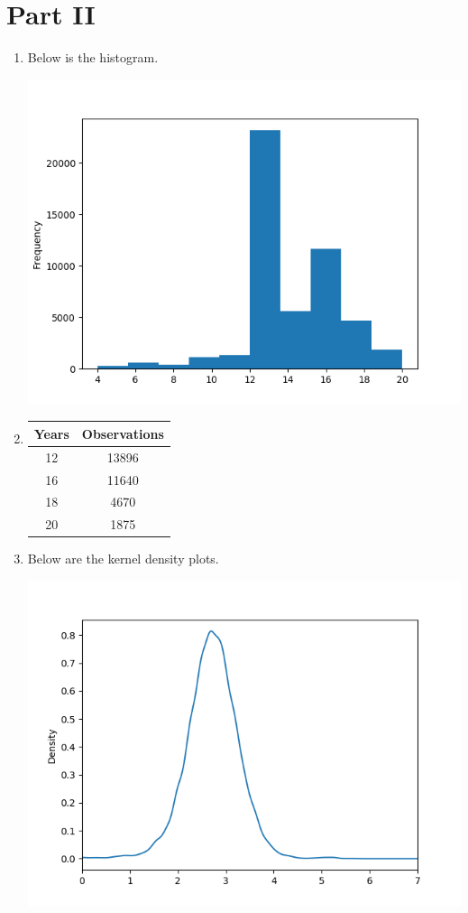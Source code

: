 \documentclass{article}
\begin{document}
\section{Part II}
\begin{enumerate}[label=\alph*)]
\item

Below is the histogram.

\includegraphics[scale=.8]{part_a}

\item

\begin{tabular}{ c c }
 Years & Observations \\
 \hline
 12 & 13896 \\ 
 16 & 11640 \\ 
 18 & 4670  \\ 
 20 & 1875 
\end{tabular}


\item

Below are the kernel density plots.

\includegraphics[scale=.8]{part_b_12}


\end{enumerate}
\end{document}
